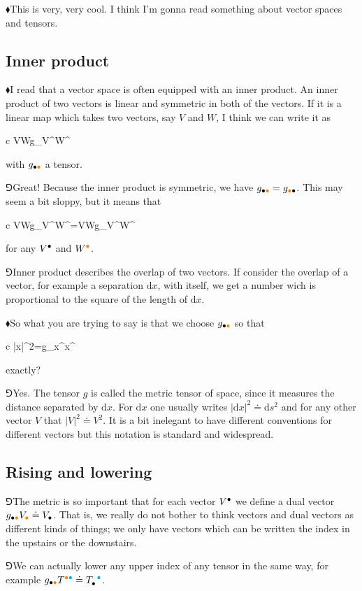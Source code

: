 \documentclass[10pt,oneside%
]{memoir}
\newenvironment{eqna}{\begin{IEEEeqnarray*}{c}}{\end{IEEEeqnarray*}\ignorespacesafterend}
\newcommand{\dd}{\mathrm{d}}
\newcommand{\tensay}[3]{#1_{#2}^{\phantom{#2}#3}}
\newcommand{\coa}{{\color{black}\bullet}}
\newcommand{\cob}{{\color{oranssi}\bullet}}
\newcommand{\coc}{{\color{cyan}\bullet}}
\newcommand{\hea}{\(\blacklozenge\)\;}
\newcommand{\heb}{\(\Game\)\;}
\begin{document}
\hea This is very, very cool. I think I'm gonna read something about vector spaces and tensors.
\subsection{Inner product}
\hea I read that a vector space is often equipped with an inner product. An inner product of two vectors is linear and symmetric in both of the vectors. If it is a linear map which takes two vectors, say \(V\) and \(W\), I think we can write it as
\begin{eqna}
    V\cdot W\doteq g_{\coa\cob}V^\coa W^\cob
\end{eqna}
with \(g_{\coa\cob}\) a tensor.

\heb Great! Because the inner product is symmetric, we have \(g_{\coa\cob}=g_{\cob\coa}\). This may seem a bit sloppy, but it means that
\begin{eqna}
    V\cdot W\doteq g_{\coa\cob}V^\coa W^\cob=V\cdot W\doteq g_{\cob\coa}V^\coa W^\cob
\end{eqna}
for any \(V^\coa\) and \(W^\cob\).

\heb Inner product describes the overlap of two vectors. If consider the overlap of a vector, for example a separation \(\dd x\), with itself, we get a number wich is proportional to the square of the length of \(\dd x\).

\hea So what you are trying to say is that we choose \(g_{\coa\cob}\) so that
\begin{eqna}
    |\dd x|^2=g_{\coa\cob}\dd x^\coa\dd x^\cob
\end{eqna}
exactly?

\heb Yes. The tensor \(g\) is called the metric tensor of space, since it measures the distance separated by \(\dd x\). For \(\dd x\) one usually writes \(|\dd x|^2\doteq\dd s^2\) and for any other vector \(V\) that \(|V|^2\doteq V^2\). It is a bit inelegant to have different conventions for different vectors but this notation is standard and widespread.
\subsection{Rising and lowering}
\heb The metric is so important that for each vector \(V^\coa\) we define a dual vector \(g_{\coa\cob}V_\cob\doteq V_\coa\). That is, we really do not bother to think vectors and dual vectors as different kinds of things; we only have vectors which can be written the index in the upstairs or the downstairs.

\heb We can actually lower any upper index of any tensor in the same way, for example \(g_{\coa\cob}T^{\cob\coc}\doteq\tensay{T}{\coa}{\coc}\).
\end{document}
